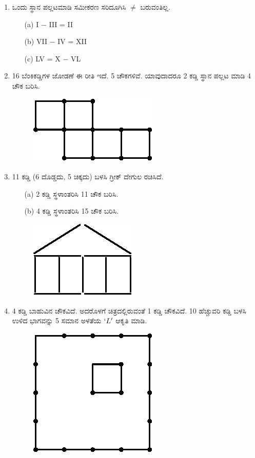 \begin{enumerate}
\item ಒಂದು ಸ್ಥಾನ ಪಲ್ಲಟಮಾಡಿ ಸಮೀಕರಣ ಸರಿದೂಗಿಸಿ $\neq$ ಬರುವಂತಿಲ್ಲ. 
\begin{itemize}
\item[(a)] I $-$ III = II
\item[(b)] VII $-$ IV = XII
\item[(c)] LV = X $-$ VL
\end{itemize}

\item 16 ಬೆಂಕಿಕಡ್ಡಿಗಳ ಜೋಡಣೆ ಈ ರೀತಿ ಇದೆ. 5 ಚೌಕಗಳಿವೆ. ಯಾವುದಾದರೂ 2 ಕಡ್ಡಿ ಸ್ಥಾನ ಪಲ್ಲಟ ಮಾಡಿ 4 ಚೌಕ ಬರಿಸಿ. 
\begin{figure}[H]
\centering
\includegraphics[scale=0.9]{images/chap9/q10.eps}
\end{figure}

\item 11 ಕಡ್ಡಿ (6 ದೊಡ್ಡದು, 5 ಚಿಕ್ಕದು) ಬಳಸಿ ಗ್ರೀಕ್ ದೇಗುಲ ರಚಿಸಿದೆ. 
\begin{itemize}
\item[(a)] 2 ಕಡ್ಡಿ ಸ್ಥಳಾಂತರಿಸಿ 11 ಚೌಕ ಬರಿಸಿ. 
\item[(b)] 4 ಕಡ್ಡಿ ಸ್ಥಳಾಂತರಿಸಿ 15 ಚೌಕ ಬರಿಸಿ. 
\end{itemize} 

\begin{figure}[H]
\centering
\includegraphics[scale=0.9]{images/chap9/q11.eps}
\end{figure}

\item 4 ಕಡ್ಡಿ ಬಾಹುವಿನ ಚೌಕವಿದೆ. ಅದರೊಳಗೆ ಚಿತ್ರದಲ್ಲಿರುವಂತೆ 1 ಕಡ್ಡಿ ಚೌಕವಿದೆ. 10 ಹೆಚ್ಚುವರಿ ಕಡ್ಡಿ ಬಳಸಿ ಉಳಿದ ಭಾಗವನ್ನು 5 ಸಮಾನ ಅಳತೆಯ $`L'$ ಆಕೃತಿ ಮಾಡಿ. 

\begin{figure}[H]
\centering
\includegraphics{images/chap9/q12.eps}
\end{figure}


\end{enumerate}
